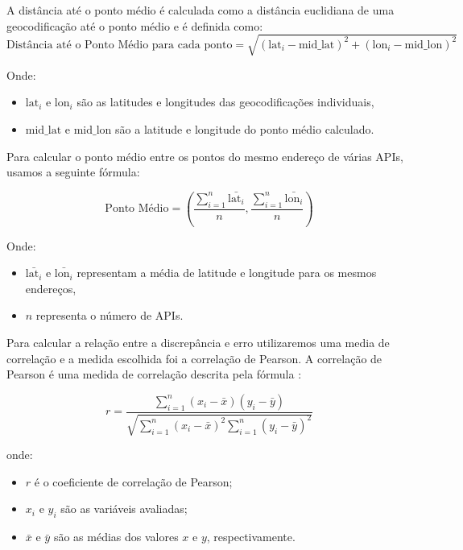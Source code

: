 A distância até o ponto médio é calculada como a distância euclidiana de uma geocodificação até o ponto médio e é definida como:
 \begin{equation}
     \text{Distância até o Ponto Médio para cada ponto} = \sqrt{(\text{lat}_i - \text{mid\_lat})^2 + (\text{lon}_i - \text{mid\_lon})^2}
 \end{equation}
 
Onde:
 \begin{itemize}
     \item $\text{lat}_i$ e $\text{lon}_i$ são as latitudes e longitudes das geocodificações individuais,
     \item $\text{mid\_lat}$ e $\text{mid\_lon}$ são a latitude e longitude do ponto médio calculado.
 \end{itemize}

Para calcular o ponto médio entre os pontos do mesmo endereço de várias APIs, usamos a seguinte fórmula:

\begin{equation}
     \text{Ponto Médio} = \left(\frac{{\sum_{i=1}^{n} \bar{\text{lat}_i}}}{n}, \frac{{\sum_{i=1}^{n} \bar{\text{lon}_i}}}{n}\right)
\end{equation}

Onde:
 \begin{itemize}
     \item $\bar{\text{lat}_i}$ e $\bar{\text{lon}_i}$ representam a média de latitude e longitude para os mesmos endereços,
     \item $n$ representa o número de APIs.
 \end{itemize}

Para calcular a relação entre a discrepância e erro utilizaremos uma media de correlação e a medida escolhida foi a correlação de Pearson. A correlação de Pearson é uma medida de correlação descrita pela fórmula \cite{callegari2007}:

\[
 r = \frac{\sum_{i=1}^{n} (x_i - \bar{x})(y_i - \bar{y})}{\sqrt{\sum_{i=1}^{n} (x_i - \bar{x})^2 \sum_{i=1}^{n} (y_i - \bar{y})^2}}
\]

 onde:
 \begin{itemize}
     \item \(r\) é o coeficiente de correlação de Pearson;
     \item \(x_i\) e \(y_i\) são as variáveis avaliadas;
     \item \(\bar{x}\) e \(\bar{y}\) são as médias dos valores \(x\) e \(y\), respectivamente.

 \end{itemize}

